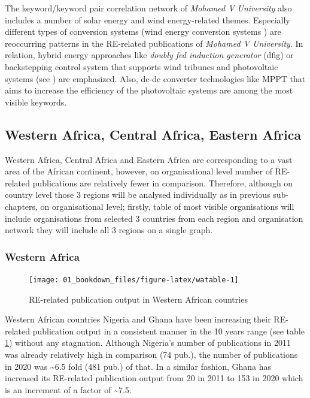 \documentclass[
]{book}
\begin{document}
The keyword/keyword pair correlation network of \emph{Mohamed V University} also includes a number of solar energy and wind energy-related themes. Especially different types of conversion systems (wind energy conversion systems ) are reoccurring patterns in the RE-related publications of \emph{Mohamed V University}. In relation, hybrid energy approaches like \emph{doubly fed induction generator} (dfig) or backstepping control system that supports wind tribunes and photovoltaic systems (see \citet{e.ahmed2012}) are emphasized. Also, dc-dc converter technologies like MPPT that aims to increase the efficiency of the photovoltaic systems are among the most visible keywords.

\hypertarget{western-africa-central-africa-eastern-africa}{%
\subsection{Western Africa, Central Africa, Eastern Africa}\label{western-africa-central-africa-eastern-africa}}

Western Africa, Central Africa and Eastern Africa are corresponding to a vast area of the African continent, however, on organisational level number of RE-related publications are relatively fewer in comparison. Therefore, although on country level those 3 regions will be analysed individually as in previous sub-chapters, on organisational level; firstly, table of most visible organisations will include organisations from selected 3 countries from each region and organisation network they will include all 3 regions on a single graph.

\hypertarget{western-africa}{%
\subsubsection{Western Africa}\label{western-africa}}

\begin{figure}
\texttt{[image: 01\_bookdown\_files/figure-latex/watable-1]} \caption{RE-related publication output in Western African countries}\label{fig:watable}
\end{figure}

Western African countries Nigeria and Ghana have been increasing their RE-related publication
output in a consistent manner in the 10 years range (see table \ref{fig:watable}) without any stagnation. Although Nigeria's number of publications in 2011 was already relatively high in comparison (74 pub.), the number of publications in 2020 was \textasciitilde6.5 fold (481 pub.) of that. In a similar fashion, Ghana has increased its RE-related publication output from 20 in 2011 to 153 in 2020 which is an increment of a factor of \textasciitilde7.5.
\end{document}
